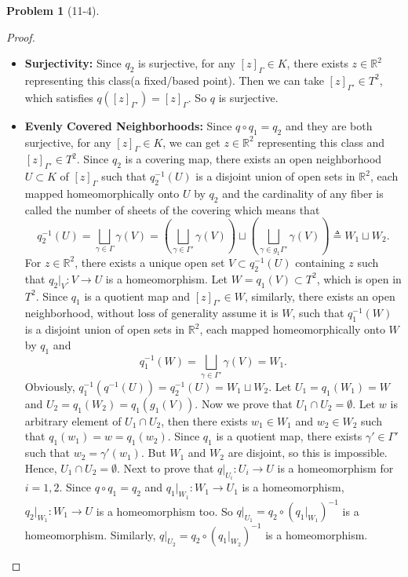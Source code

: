 \documentclass[11pt, a4paper]{article}
\theoremstyle{definition}
\newtheorem{prob}{Problem}
\newenvironment{problem}[1][]{\begin{prob}[#1]\normalfont}{\end{prob}\vspace{1.5em}}
\begin{document}
\begin{problem}[11-4]
\begin{proof}
\begin{itemize}
    \item[$3^\circ$] \textbf{Surjectivity:} Since $q_2$ is surjective, for any $[z]_{\Gamma} \in K$, there exists 
    $z \in \mathbb{R}^2$ representing this class(a fixed/based point). Then we can take $[z]_{\Gamma'} \in T^2$, 
    which satisfies $q([z]_{\Gamma'}) = [z]_{\Gamma}$. So $q$ is surjective.

    \item [$4^\circ$] \textbf{Evenly Covered Neighborhoods:} Since $ q\circ q_1 = q_2$ and they are both surjective, 
    for any $[z]_{\Gamma} \in K$, we can get $z \in \mathbb{R}^2$ representing this class and $[z]_{\Gamma'} \in T^2$.
    Since $q_2$ is a covering map, there exists an open neighborhood $U \subset K$ of $[z]_{\Gamma}$ such that 
    $q_2^{-1}(U)$ is a disjoint union of open sets in $\mathbb{R}^2$, each mapped homeomorphically onto $U$ by $q_2$ 
    and the cardinality of any fiber is called the number of sheets of the covering which means that  
    $$q_2^{-1}(U) = \bigsqcup_{\gamma \in \Gamma} \gamma(V) = (\bigsqcup_{\gamma \in \Gamma'} \gamma(V))\sqcup  (\bigsqcup_{\gamma \in {g_1\Gamma'}} \gamma(V))\triangleq W_1\sqcup W_2.$$ 
    For $z\in \mathbb{R}^2$, there exists a unique open set $V \subset q_2^{-1}(U)$ 
    containing $z$ such that $q_2|_{V}: V \to U$ is a homeomorphism. Let $W = q_1(V) \subset T^2$, which is open in $T^2$. 
    Since $q_1$ is a quotient map and $[z]_{\Gamma'} \in W$, similarly, there exists an open neighborhood, without 
    loss of generality assume it is $W$, such that $q_1^{-1}(W)$ is a disjoint union of open sets in $\mathbb{R}^2$, 
    each mapped homeomorphically onto $W$ by $q_1$ and 
    $$q_1^{-1}(W)= \bigsqcup_{\gamma \in \Gamma'} \gamma(V) = W_1.$$ 
    Obviously, $q_1^{-1}(q^{-1}(U)) = q_2^{-1}(U) = W_1\sqcup W_2$. Let $U_1 = q_1(W_1) = W$ and $U_2 = q_1(W_2) = q_1(g_1(V))$.
    Now we prove that $U_1\cap U_2 = \emptyset$. Let $w$ is arbitrary element of $U_1\cap U_2$, then there exists 
    $w_1 \in W_1$ and $w_2 \in W_2$ such that $q_1(w_1) = w = q_1(w_2)$. Since $q_1$ is a quotient map, there exists 
    $\gamma' \in \Gamma'$ such that $w_2 = \gamma'(w_1)$. But $W_1$ and $W_2$ are disjoint, so this is impossible. 
    Hence, $U_1\cap U_2 = \emptyset$. Next to prove that $q|_{U_i}: U_i \to U$ is a homeomorphism for $i=1,2$. 
    Since $q\circ q_1 = q_2$ and $q_1|_{W_1}: W_1 \to U_1$ is a homeomorphism, $q_2|_{W_1}: W_1 \to U$ 
    is a homeomorphism too. So $q|_{U_1} = q_2 \circ (q_1|_{W_1})^{-1}$ is a homeomorphism. Similarly, 
    $q|_{U_2} = q_2 \circ (q_1|_{W_2})^{-1}$ is a homeomorphism.
    

\end{itemize}
\end{proof}
\end{problem}
\end{document}
